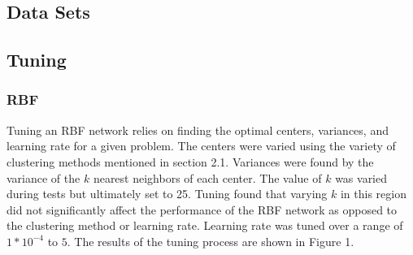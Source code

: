 \documentclass[twoside,11pt]{article}
\begin{document}
\subsection{Data Sets}
\subsection{Tuning}
\subsubsection{RBF}
Tuning an RBF network relies on finding the optimal centers, variances, and learning rate for a given problem. The centers were varied using the variety of clustering methods mentioned in section 2.1. Variances were found by the variance of the $k$ nearest neighbors of each center. The value of $k$ was varied during tests but ultimately set to 25. Tuning found that varying $k$ in this region did not significantly affect the performance of the RBF network as opposed to the clustering method or learning rate. Learning rate was tuned over a range of $1*10^{-4}$ to $5$. The results of the tuning process are shown in Figure 1. %
\end{document}
